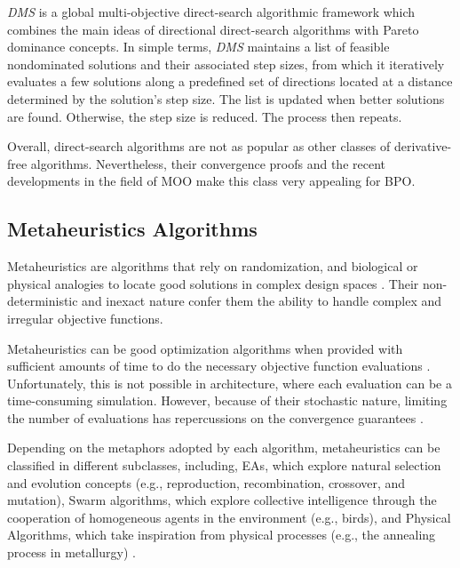 \textit{\ac{DMS}} \cite{Custodio2010} is a global multi-objective direct-search algorithmic framework which combines the main ideas of directional direct-search algorithms with Pareto dominance concepts. In simple terms, \textit{\ac{DMS}} maintains a list of feasible nondominated solutions and their associated step sizes, from which it iteratively evaluates a few solutions along a predefined set of directions located at a distance determined by the solution's step size. The list is updated when better solutions are found. Otherwise, the step size is reduced. The process then repeats. 

Overall, direct-search algorithms are not as popular as other classes of derivative-free algorithms. Nevertheless, their convergence proofs and the recent developments in the field of \ac{MOO} make this class very appealing for \ac{BPO}. 

\subsection{Metaheuristics Algorithms}
Metaheuristics are algorithms that rely on randomization, and biological or physical analogies to locate good solutions in complex design spaces \cite{Glover2003Metaheuristics}. Their non-deterministic and inexact nature confer them the ability to handle complex and irregular objective functions.

Metaheuristics can be good optimization algorithms when provided with sufficient amounts of time to do the necessary objective function evaluations \cite{Conn2009}. Unfortunately, this is not possible in architecture, where each evaluation can be a time-consuming simulation. However, because of their stochastic nature, limiting the number of evaluations has repercussions on the convergence guarantees \cite{Hasancebi2009}.

Depending on the metaphors adopted by each algorithm, metaheuristics can be classified in different subclasses, including, \acp{EA}, which explore natural selection and evolution concepts (e.g., reproduction, recombination, crossover, and mutation), Swarm algorithms, which explore collective intelligence through the cooperation of homogeneous agents in the environment (e.g., birds), and Physical Algorithms, which take inspiration from physical processes (e.g., the annealing process in metallurgy) \cite{Glover2003Metaheuristics}.

